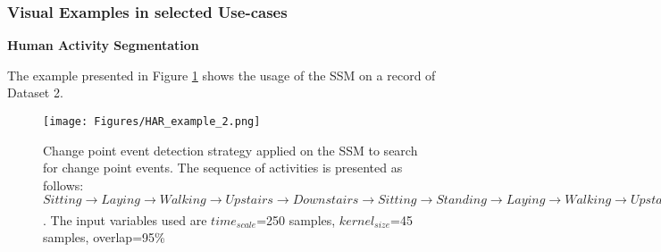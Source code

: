 \subsubsection{Visual Examples in selected Use-cases}

{\normalsize \textbf{Human Activity Segmentation}}\\
\par
The example presented in Figure \ref{fig:event_search_demonstration} shows the usage of the \gls{SSM} on a record of Dataset 2. 

\begin{figure}
    \centering
    \texttt{[image: Figures/HAR\_example\_2.png]}
    \caption{Change point event detection strategy applied on the SSM to search for change point events. The sequence of activities is presented as follows: $Sitting \xrightarrow[]{} Laying \xrightarrow[]{} Walking \xrightarrow[]{} Upstairs \xrightarrow[]{} Downstairs \xrightarrow[]{} Sitting \xrightarrow[]{} Standing \xrightarrow[]{} Laying \xrightarrow[]{} Walking \xrightarrow[]{} Upstairs$. The input variables used are $time_{scale}$=250 samples, $kernel_{size}$=45 samples, overlap=95\%}
    \label{fig:event_search_demonstration}
\end{figure}

